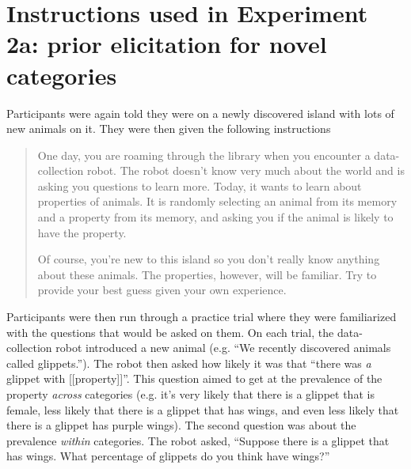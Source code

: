 \documentclass[10pt,letterpaper]{article}
\begin{document}
\section{Instructions used in Experiment 2a: prior elicitation for novel categories}
\label{sec:prior2instruct}

Participants were again told they were on a newly discovered island with lots of new animals on it. They were then given the following instructions

\begin{quote}
One day, you are roaming through the library when you encounter a data-collection robot. The robot doesn't know very much about the world and is asking you questions to learn more. Today, it wants to learn about properties of animals. It is randomly selecting an animal from its memory and a property from its memory, and asking you if the animal is likely to have the property.

Of course, you're new to this island so you don't really know anything about these animals. The properties, however, will be familiar. Try to provide your best guess given your own experience.
\end{quote}

Participants were then run through a practice trial where they were familiarized with the questions that would be asked on them. 
On each trial, the data-collection robot introduced a new animal (e.g. ``We recently discovered animals called glippets.''). 
The robot then asked how likely it was that ``there was \emph{a} glippet with [[property]]''. 
This question aimed to get at the prevalence of the property \emph{across} categories (e.g. it's very likely that there is a glippet that is female, less likely that there is a glippet that has wings, and even less likely that there is a glippet has purple wings). 
The second question was about the prevalence \emph{within} categories. The robot asked, ``Suppose there is a glippet that has wings. What percentage of glippets do you think have wings?''





\setlength{\bibleftmargin}{.125in}
\setlength{\bibindent}{-\bibleftmargin}


\end{document}
